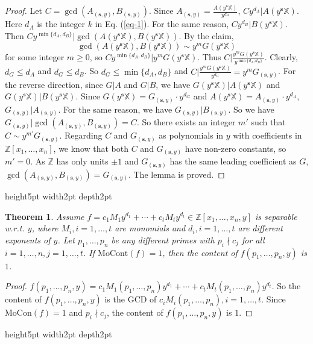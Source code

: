 \documentclass[final,20pt]{elsarticle}
\newtheorem{theorem}{Theorem}[section]
\def\Z{{\mathbb Z}}
\def\X{{\mathbb{X}}}
\def\qed{\hfil {\vrule height5pt width2pt depth2pt}}
\begin{document}
\begin{proof}
Let $C=\gcd(A_{(\mathbf{s},y)},B_{(\mathbf{s},y)})$. Since $A_{(\mathbf{s},y)}=\frac{A(y^\mathbf{s}\X)}{y^{d_A}}$, $Cy^{d_A}|A(y^\mathbf{s}\X)$.
Here $d_A$ is the integer $k$ in Eq. (\ref{eq-1}).
%
For the same reason, $Cy^{d_B}|B(y^\mathbf{s}\X)$.
%
Then $Cy^{\min\{d_A,d_B\}}|\gcd(A(y^\mathbf{s}\X),B(y^\mathbf{s}\X))$.
%
%
By the claim, $$\gcd(A(y^\mathbf{s}\X),B(y^\mathbf{s}\X))\sim y^mG(y^\mathbf{s}\X)$$ for some integer $m\geq 0$,
so $Cy^{\min\{d_A,d_B\}}|y^mG(y^\mathbf{s}\X)$.
%
Thus
$C|\frac{y^mG(y^\mathbf{s}\X)}{y^{\min\{d_A,d_B\}}}.$
%
Clearly, $d_G\leq d_A$ and $d_G\leq d_B$. So
$d_G\leq \min\{d_A,d_B\}$ and  $C|\frac{y^mG(y^\mathbf{s}\X)}{y^{d_G}}=y^mG_{(\mathbf{s},y)}$.
%
%
For the reverse direction, since $G|A$ and $G|B$, we have $G(y^\mathbf{s}\X)|A(y^\mathbf{s}\X)$ and $G(y^\mathbf{s}\X)|B(y^\mathbf{s}\X)$.
%
Since $G(y^\mathbf{s}\X)=G_{(\mathbf{s},y)}\cdot y^{d_G}$ and $A(y^\mathbf{s}\X)=A_{(\mathbf{s},y)}\cdot y^{d_A}$,
$G_{(\mathbf{s},y)}|A_{(\mathbf{s},y)}$. For the same reason, we have $G_{(\mathbf{s},y)}|B_{(\mathbf{s},y)}$.
So we have $G_{(\mathbf{s},y)}|\gcd(A_{(\mathbf{s},y)},B_{(\mathbf{s},y)})=C.$
So there exists an integer $m'$ such that $C\sim y^{m'}G_{(\mathbf{s},y)}$. Regarding $C$ and $G_{(\mathbf{s},y)}$ as polynomials in $y$ with coefficients in $\Z[x_1,\dots,x_n]$, we know that both $C$ and $G_{(\mathbf{s},y)}$ have non-zero constants, so $m'=0$. As $\Z$ has only units $\pm 1$ and $G_{(\mathbf{s},y)}$ has the same leading coefficient as $G$, $\gcd(A_{(\mathbf{s},y)},B_{(\mathbf{s},y)})=G_{(\mathbf{s},y)}$. The lemma is proved.
\end{proof}\qed





\begin{theorem}\label{the-2}
Assume $f=c_1M_1y^{d_1}+\cdots+c_tM_ty^{d_t}\in \Z[x_1,\dots,x_n,y]$ is separable w.r.t. $y$, where $M_i,i=1,\dots,t$ are monomials and $d_i,i=1,\dots,t$ are different exponents of $y$. Let $p_1,\dots,p_n$ be any different primes with $p_i\nmid c_j$ for all $i=1,\dots,n,j=1,\dots,t$. If $\mathrm{MoCont}(f)=1$, then
the content of $f(p_1,\dots,p_n,y)$ is $1$.
\end{theorem}

\begin{proof}
$f(p_1,\dots,p_n,y)=c_1M_1(p_1,\dots,p_n)y^{d_1}+\cdots+c_tM_t(p_1,\dots,p_n)y^{d_t}$.
%
So the content of $f(p_1,\dots,p_n,y)$ is the GCD of $c_iM_i(p_1,\dots,p_n),i=1,\dots,t$. Since $\mathrm{MoCon}(f)=1$ and $p_i\nmid c_j$, the content of $f(p_1,\dots,p_n,y)$ is $1$.
\end{proof}\qed
\end{document}

